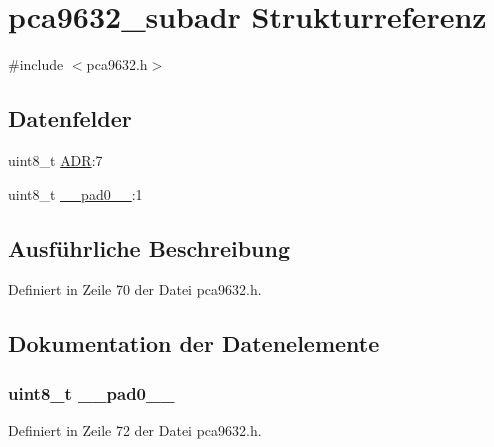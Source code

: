 \hypertarget{structpca9632__subadr}{}\section{pca9632\+\_\+subadr Strukturreferenz}
\label{structpca9632__subadr}


{\ttfamily \#include $<$pca9632.\+h$>$}

\subsection*{Datenfelder}
\begin{DoxyCompactItemize}
\item 
uint8\+\_\+t \hyperlink{structpca9632__subadr_a3f0aebe309fed43964b4309ad88f9fb5}{A\+D\+R}\+:7
\item 
uint8\+\_\+t \hyperlink{structpca9632__subadr_a8b4eebe79ded0459acec2f4950102ba3}{\+\_\+\+\_\+pad0\+\_\+\+\_\+}\+:1
\end{DoxyCompactItemize}


\subsection{Ausführliche Beschreibung}


Definiert in Zeile 70 der Datei pca9632.\+h.



\subsection{Dokumentation der Datenelemente}
\hypertarget{structpca9632__subadr_a8b4eebe79ded0459acec2f4950102ba3}{}
\subsubsection[{\+\_\+\+\_\+pad0\+\_\+\+\_\+}]{\setlength{\rightskip}{0pt plus 5cm}uint8\+\_\+t \+\_\+\+\_\+pad0\+\_\+\+\_\+}\label{structpca9632__subadr_a8b4eebe79ded0459acec2f4950102ba3}


Definiert in Zeile 72 der Datei pca9632.\+h.

\hypertarget{structpca9632__subadr_a3f0aebe309fed43964b4309ad88f9fb5}{}
